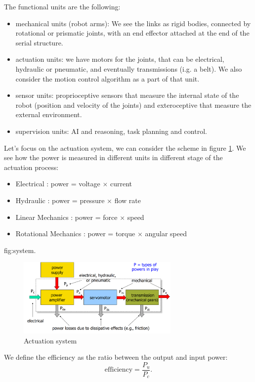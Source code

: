 \documentclass[10pt, letterpaper]{report}
\begin{document}
The functional units are the following:\begin{itemize}
    \item mechanical units (robot arms): We see the links as rigid bodies, connected by rotational or prismatic joints, with an end effector attached at the end of the serial structure.
    \item actuation units: we have motors for the joints, that can be electrical, hydraulic or pneumatic, and eventually transmissions (i.g. a belt). We also consider the motion control algorithm as a part of that unit.
    \item sensor units: proprioceptive sensors that measure the internal state of the robot (position and velocity of the joints) and exteroceptive that measure the external environment.
    \item supervision units: AI and reasoning, task planning and control.
\end{itemize}
Let's focus on the actuation system, we can consider the scheme in figure \ref{fig:Actuationsystem}. We see how the power is measured in different units in different stage of the actuation process:\begin{itemize}
    \item Electrical : power = voltage $\times$ current
    \item Hydraulic : power = pressure $\times$ flow rate 
    \item Linear Mechanics : power = force $\times$ speed 
    \item Rotational Mechanics : power = torque $\times$ angular speed
\end{itemize}
{fig:system}.

\begin{figure}[h!]
    \centering
    \includegraphics[width=0.7\textwidth ]{images/actuation_system.png} 
    \caption{Actuation system}
    \label{fig:Actuationsystem}
\end{figure}


We define the efficiency as the ratio between the output and input power:\begin{equation}
    \text{efficiency}=\frac{P_u}{P_c}.
\end{equation}
\end{document}

